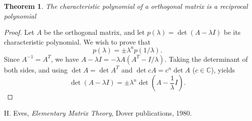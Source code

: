 \documentclass[12pt]{article}
\newtheorem{thm}{Theorem}
\begin{document}
\begin{thm}
The characteristic polynomial of a orthogonal matrix is a reciprocal polynomial
\end{thm}

\begin{proof}
Let $A$ be the orthogonal matrix, and let 
$p(\lambda) = \det(A-\lambda I)$ be 
its characteristic polynomial. We wish to prove that 
$$ 
  p(\lambda) = \pm \lambda^n p(1/\lambda).
$$
Since $A^{-1}=A^T$, we have 
$A-\lambda I=-\lambda A (A^T-I/\lambda ).$
Taking the determinant of both sides, and using 
$\det A = \det A^T$ and 
$\det c A = c^n \det A$ ($c\in \mathbb{C}$), 
yields
$$ \det (A-\lambda I) = \pm \lambda^n \det(A-\frac{1}{\lambda} I).$$
\end{proof}

\begin{thebibliography}{9}
 H. Eves,
 \emph{Elementary Matrix Theory}, Dover publications, 1980.
\end{thebibliography}
\end{document}
